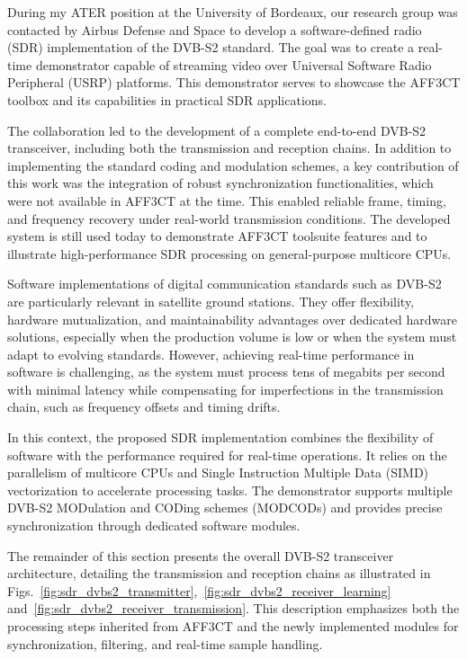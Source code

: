 \documentclass[11pt]{report}
\newcommand{\AFFECT}{AFF3CT\xspace}
\begin{document}
During my ATER position at the University of Bordeaux, our research group was
contacted by Airbus Defense and Space to develop a software-defined radio (SDR)
implementation of the DVB-S2 standard. The goal was to create a real-time
demonstrator capable of streaming video over Universal Software Radio Peripheral
(USRP) platforms. This demonstrator serves to showcase the \AFFECT toolbox and
its capabilities in practical SDR applications.

The collaboration led to the development of a complete end-to-end DVB-S2
transceiver, including both the transmission and reception chains. In addition
to implementing the standard coding and modulation schemes, a key contribution
of this work was the integration of robust synchronization functionalities,
which were not available in \AFFECT at the time. This enabled reliable frame,
timing, and frequency recovery under real-world transmission conditions. The
developed system is still used today to demonstrate \AFFECT toolsuite features
and to illustrate high-performance SDR processing on general-purpose multicore
CPUs.

Software implementations of digital communication standards such as DVB-S2 are
particularly relevant in satellite ground stations. They offer flexibility,
hardware mutualization, and maintainability advantages over dedicated hardware
solutions, especially when the production volume is low or when the system must
adapt to evolving standards. However, achieving real-time performance in
software is challenging, as the system must process tens of megabits per second
with minimal latency while compensating for imperfections in the transmission
chain, such as frequency offsets and timing drifts.

In this context, the proposed SDR implementation combines the flexibility of
software with the performance required for real-time operations. It relies on
the parallelism of multicore CPUs and Single Instruction Multiple Data (SIMD)
vectorization to accelerate processing tasks. The demonstrator supports multiple
DVB-S2 MODulation and CODing schemes (MODCODs) and provides precise
synchronization through dedicated software modules.

The remainder of this section presents the overall DVB-S2 transceiver
architecture, detailing the transmission and reception chains as illustrated in
Figs.~\ref{fig:sdr_dvbs2_transmitter},~\ref{fig:sdr_dvbs2_receiver_learning}
and~\ref{fig:sdr_dvbs2_receiver_transmission}. This description emphasizes both
the processing steps inherited from \AFFECT and the newly implemented modules
for synchronization, filtering, and real-time sample handling.
\end{document}
